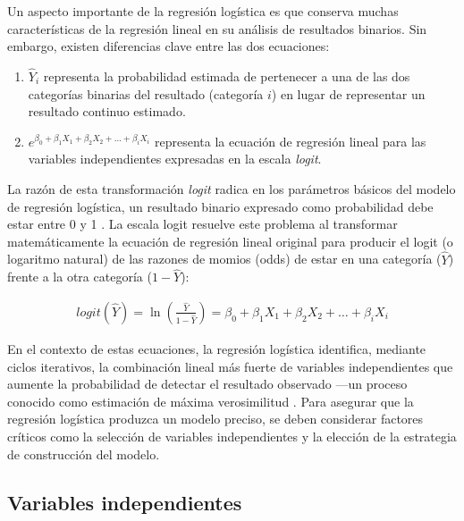\documentclass[12pt]{article}
\begin{document}
Un aspecto importante de la regresi\'on log\'istica es que conserva muchas caracter\'isticas de la regresi\'on lineal en su an\'alisis de resultados binarios. Sin embargo, existen diferencias clave entre las dos ecuaciones:

\begin{enumerate}
  \item $\hat{Y}_i$ representa la probabilidad estimada de pertenecer a una de las dos categor\'ias binarias del resultado (categor\'ia $i$) en lugar de representar un resultado continuo estimado.
  
  \item $e^{\beta_0 + \beta_1 X_1 + \beta_2 X_2 + \ldots + \beta_i X_i}$ representa la ecuaci\'on de regresi\'on lineal para las variables independientes expresadas en la escala \textit{logit}.
\end{enumerate}

La raz\'on de esta transformaci\'on \textit{logit} radica en los par\'ametros b\'asicos del modelo de regresi\'on log\'istica, un resultado binario expresado como probabilidad debe estar entre 0 y 1 \cite{darlington1990}. La escala logit resuelve este problema al transformar matem\'aticamente la ecuaci\'on de regresi\'on lineal original para producir el logit (o logaritmo natural) de las razones de momios (odds) de estar en una categor\'ia ($\hat{Y}$) frente a la otra categor\'ia ($1 - \hat{Y}$):

\begin{eqnarray}
logit(\hat{Y})=\ln\left(\frac{\hat{Y}}{1 - \hat{Y}}\right) = \beta_0 + \beta_1 X_1 + \beta_2 X_2 + \ldots + \beta_i X_i
\end{eqnarray}

En el contexto de estas ecuaciones, la regresi\'on log\'istica identifica, mediante ciclos iterativos, la combinaci\'on lineal m\'as fuerte de variables independientes que aumente la probabilidad de detectar el resultado observado —un proceso conocido como estimaci\'on de m\'axima verosimilitud \cite{tabachnick2007,hosmer2000}. Para asegurar que la regresi\'on log\'istica produzca un modelo preciso, se deben considerar factores cr\'iticos como la selecci\'on de variables independientes y la elecci\'on de la estrategia de construcci\'on del modelo.

\subsection{Variables independientes}
\end{document}
